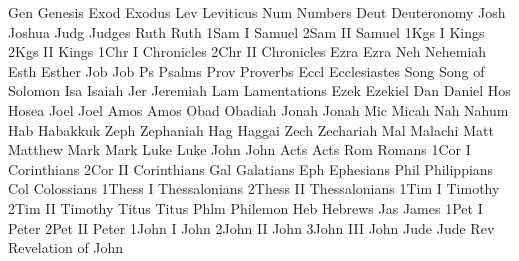 \BookTitle Gen {Genesis}
\BookTitle Exod {Exodus}
\BookTitle Lev {Leviticus}
\BookTitle Num {Numbers}
\BookTitle Deut {Deuteronomy}
\BookTitle Josh {Joshua}
\BookTitle Judg {Judges}
\BookTitle Ruth {Ruth}
\BookTitle 1Sam {I Samuel}
\BookTitle 2Sam {II Samuel}
\BookTitle 1Kgs {I Kings}
\BookTitle 2Kgs {II Kings}
\BookTitle 1Chr {I Chronicles}
\BookTitle 2Chr {II Chronicles}
\BookTitle Ezra {Ezra}
\BookTitle Neh {Nehemiah}
\BookTitle Esth {Esther}
\BookTitle Job {Job}
\BookTitle Ps {Psalms}
\BookTitle Prov {Proverbs}
\BookTitle Eccl {Ecclesiastes}
\BookTitle Song {Song of Solomon}
\BookTitle Isa {Isaiah}
\BookTitle Jer {Jeremiah}
\BookTitle Lam {Lamentations}
\BookTitle Ezek {Ezekiel}
\BookTitle Dan {Daniel}
\BookTitle Hos {Hosea}
\BookTitle Joel {Joel}
\BookTitle Amos {Amos}
\BookTitle Obad {Obadiah}
\BookTitle Jonah {Jonah}
\BookTitle Mic {Micah}
\BookTitle Nah {Nahum}
\BookTitle Hab {Habakkuk}
\BookTitle Zeph {Zephaniah}
\BookTitle Hag {Haggai}
\BookTitle Zech {Zechariah}
\BookTitle Mal {Malachi}
\BookTitle Matt {Matthew}
\BookTitle Mark {Mark}
\BookTitle Luke {Luke}
\BookTitle John {John}
\BookTitle Acts {Acts}
\BookTitle Rom {Romans}
\BookTitle 1Cor {I Corinthians}
\BookTitle 2Cor {II Corinthians}
\BookTitle Gal {Galatians}
\BookTitle Eph {Ephesians}
\BookTitle Phil {Philippians}
\BookTitle Col {Colossians}
\BookTitle 1Thess {I Thessalonians}
\BookTitle 2Thess {II Thessalonians}
\BookTitle 1Tim {I Timothy}
\BookTitle 2Tim {II Timothy}
\BookTitle Titus {Titus}
\BookTitle Phlm {Philemon}
\BookTitle Heb {Hebrews}
\BookTitle Jas {James}
\BookTitle 1Pet {I Peter}
\BookTitle 2Pet {II Peter}
\BookTitle 1John {I John}
\BookTitle 2John {II John}
\BookTitle 3John {III John}
\BookTitle Jude {Jude}
\BookTitle Rev {Revelation of John}
